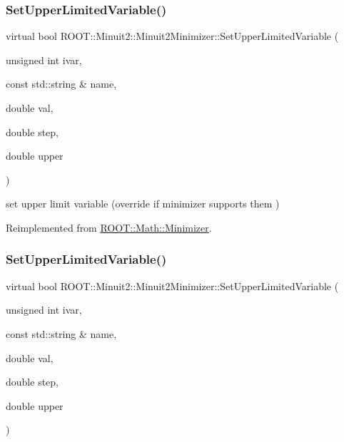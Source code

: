 \subsubsection{\texorpdfstring{SetUpperLimitedVariable()}{SetUpperLimitedVariable()}\hspace{0.1cm}{\footnotesize\ttfamily [1/2]}}
{\footnotesize\ttfamily virtual bool R\+O\+O\+T\+::\+Minuit2\+::\+Minuit2\+Minimizer\+::\+Set\+Upper\+Limited\+Variable (\begin{DoxyParamCaption}\item[{unsigned int}]{ivar,  }\item[{const std\+::string \&}]{name,  }\item[{double}]{val,  }\item[{double}]{step,  }\item[{double}]{upper }\end{DoxyParamCaption})\hspace{0.3cm}{\ttfamily [virtual]}}



set upper limit variable (override if minimizer supports them ) 



Reimplemented from \mbox{\hyperlink{classROOT_1_1Math_1_1Minimizer_a804843fbaea82809b3c54232d0c1fe86}{R\+O\+O\+T\+::\+Math\+::\+Minimizer}}.

\mbox{\label{classROOT_1_1Minuit2_1_1Minuit2Minimizer_a70209b37c419af5d8d1475ce8de29b43}} 
\subsubsection{\texorpdfstring{SetUpperLimitedVariable()}{SetUpperLimitedVariable()}\hspace{0.1cm}{\footnotesize\ttfamily [2/2]}}
{\footnotesize\ttfamily virtual bool R\+O\+O\+T\+::\+Minuit2\+::\+Minuit2\+Minimizer\+::\+Set\+Upper\+Limited\+Variable (\begin{DoxyParamCaption}\item[{unsigned int}]{ivar,  }\item[{const std\+::string \&}]{name,  }\item[{double}]{val,  }\item[{double}]{step,  }\item[{double}]{upper }\end{DoxyParamCaption})\hspace{0.3cm}{\ttfamily [virtual]}}



